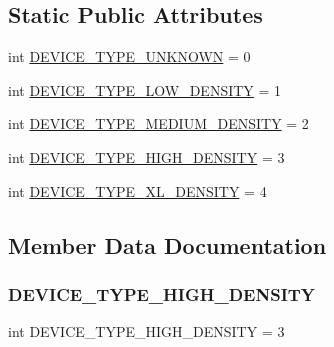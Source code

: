 \subsection*{Static Public Attributes}
\begin{DoxyCompactItemize}
\item 
int \hyperlink{classstm__tools_1_1serialflasher_1_1devices_1_1DeviceDensity_aa366990eb432a5857261b6695d5103e1}{D\+E\+V\+I\+C\+E\+\_\+\+T\+Y\+P\+E\+\_\+\+U\+N\+K\+N\+O\+WN} = 0
\item 
int \hyperlink{classstm__tools_1_1serialflasher_1_1devices_1_1DeviceDensity_a987fd1fab631cf6767c526467d03b809}{D\+E\+V\+I\+C\+E\+\_\+\+T\+Y\+P\+E\+\_\+\+L\+O\+W\+\_\+\+D\+E\+N\+S\+I\+TY} = 1
\item 
int \hyperlink{classstm__tools_1_1serialflasher_1_1devices_1_1DeviceDensity_a111774c04b9d3490c052abb4628efe95}{D\+E\+V\+I\+C\+E\+\_\+\+T\+Y\+P\+E\+\_\+\+M\+E\+D\+I\+U\+M\+\_\+\+D\+E\+N\+S\+I\+TY} = 2
\item 
int \hyperlink{classstm__tools_1_1serialflasher_1_1devices_1_1DeviceDensity_adf7ca92546276150a967a821fa53fc5b}{D\+E\+V\+I\+C\+E\+\_\+\+T\+Y\+P\+E\+\_\+\+H\+I\+G\+H\+\_\+\+D\+E\+N\+S\+I\+TY} = 3
\item 
int \hyperlink{classstm__tools_1_1serialflasher_1_1devices_1_1DeviceDensity_afdb0be7b9130a97eeedb21b56eb8b1f7}{D\+E\+V\+I\+C\+E\+\_\+\+T\+Y\+P\+E\+\_\+\+X\+L\+\_\+\+D\+E\+N\+S\+I\+TY} = 4
\end{DoxyCompactItemize}


\subsection{Member Data Documentation}
\mbox{\label{classstm__tools_1_1serialflasher_1_1devices_1_1DeviceDensity_adf7ca92546276150a967a821fa53fc5b}} 
\subsubsection{\texorpdfstring{D\+E\+V\+I\+C\+E\+\_\+\+T\+Y\+P\+E\+\_\+\+H\+I\+G\+H\+\_\+\+D\+E\+N\+S\+I\+TY}{DEVICE\_TYPE\_HIGH\_DENSITY}}
{\footnotesize\ttfamily int D\+E\+V\+I\+C\+E\+\_\+\+T\+Y\+P\+E\+\_\+\+H\+I\+G\+H\+\_\+\+D\+E\+N\+S\+I\+TY = 3\hspace{0.3cm}{\ttfamily [static]}}

